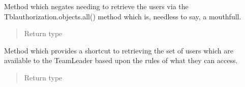 \documentclass[letterpaper,10pt,english]{sphinxmanual}
\begin{document}
\begin{fulllineitems}
\begin{fulllineitems}
\begin{quote}
\begin{description}
\end{description}\end{quote}

\end{fulllineitems}


\begin{fulllineitems}
\label{code:timetracker.tracker.models.Tblauthorization.manager_view}
Method which negates needing to retrieve the users via the
Tblauthorization.objects.all() method which is, needless to say, a
mouthfull.
\begin{quote}\begin{description}
\item[{Return type}] \leavevmode
{}

\end{description}\end{quote}

\end{fulllineitems}


\begin{fulllineitems}
\label{code:timetracker.tracker.models.Tblauthorization.teamleader_view}
Method which provides a shortcut to retrieving the set of users which
are available to the TeamLeader based upon the rules of what they can
access.
\begin{quote}\begin{description}
\item[{Return type}] \leavevmode
{}

\end{description}\end{quote}

\end{fulllineitems}


\end{fulllineitems}

\end{document}
